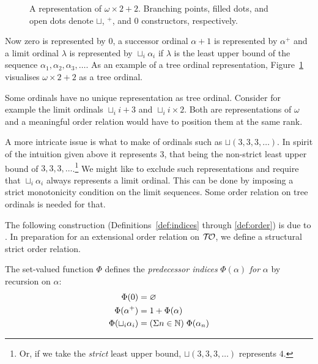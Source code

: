 \begin{figure}
\begin{center}
\begin{tikzpicture}[scale=0.9]

\end{tikzpicture}
\end{center}
\caption{A representation of $\omega \times 2 + 2$. Branching points,
  filled dots, and open dots denote $\sqcup$, $^+$, and $0$
  constructors, respectively.}\label{fig:tree}
\end{figure}

Now zero is represented by $0$, a successor ordinal $\alpha +1$ is represented
by $\alpha^+$ and a limit ordinal $\lambda$ is represented by $\sqcup_i
\alpha_i$ if $\lambda$ is the least upper bound of the sequence $\alpha_1,
\alpha_2, \alpha_3, \ldots$. As an example of a tree ordinal representation,
Figure~\ref{fig:tree} visualises $\omega \times 2 + 2$ as a tree
ordinal.

Some ordinals have no unique representation as tree ordinal. Consider for
example the limit ordinals $\sqcup_i i + 3$ and $\sqcup_i i \times 2$. Both
are representations of $\omega$ and a meaningful order relation would
have to position them at the same rank.

A more intricate issue is what to make of ordinals such as $\sqcup (
3, 3, 3, \ldots )$. In spirit of the intuition given above it
represents $3$, that being the non-strict least upper bound of $3, 3,
3, \ldots$.\footnote{Or, if we take the \emph{strict} least upper bound, $\sqcup (
3, 3, 3, \ldots )$ represents $4$.}
We might like to exclude such representations and require that
$\sqcup_i \alpha_i$ always represents a limit ordinal. This can be
done by imposing a strict monotonicity condition on the limit
sequences. Some order relation on tree ordinals is needed for that.

The following construction (Definitions~\ref{def:indices}
through \ref{def:order}) is due to \citet{hancock-08}. In preparation
for an extensional order relation on $\Ord$, we define a structural
strict order relation.

\begin{definition}\label{def:indices}%
The set-valued function $\Phi$ defines the \emph{predecessor indices}
$\Phi(\alpha)$ \emph{for} $\alpha$ by recursion on $\alpha$:
\begin{align*}
  \Phi(0)                 &= \nothing \\
  \Phi(\alpha^+)          &= 1 + \Phi(\alpha) \\ %
  \Phi(\sqcup_i \alpha_i) &= (\Sigma n \in \mathbb{N}) \; \Phi(\alpha_n)
\end{align*}
\end{definition}

